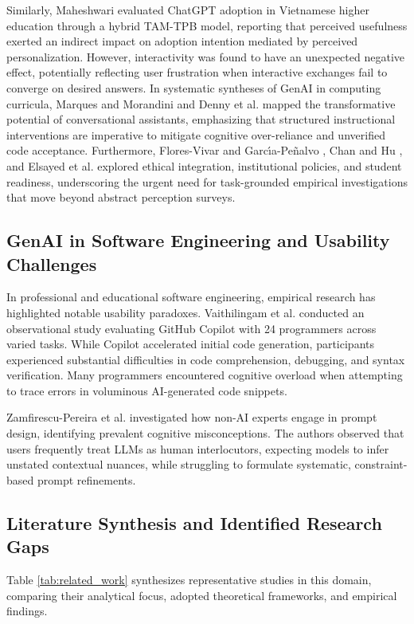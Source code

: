 \documentclass{cleiej}
\begin{document}
Similarly, Maheshwari \cite{maheshwari2024factors} evaluated ChatGPT adoption in Vietnamese higher education through a hybrid TAM-TPB model, reporting that perceived usefulness exerted an indirect impact on adoption intention mediated by perceived personalization. However, interactivity was found to have an unexpected negative effect, potentially reflecting user frustration when interactive exchanges fail to converge on desired answers. In systematic syntheses of GenAI in computing curricula, Marques and Morandini \cite{marques2024uso} and Denny et al. \cite{denny2024computing} mapped the transformative potential of conversational assistants, emphasizing that structured instructional interventions are imperative to mitigate cognitive over-reliance and unverified code acceptance. Furthermore, Flores-Vivar and Garc{\'\i}a-Pe{\~n}alvo \cite{flores2023reflections}, Chan and Hu \cite{chan2023potential}, and Elsayed et al. \cite{elsayed2023towards} explored ethical integration, institutional policies, and student readiness, underscoring the urgent need for task-grounded empirical investigations that move beyond abstract perception surveys.

\subsection{GenAI in Software Engineering and Usability Challenges}
In professional and educational software engineering, empirical research has highlighted notable usability paradoxes. Vaithilingam et al. \cite{vaithilingam2022expectation} conducted an observational study evaluating GitHub Copilot with 24 programmers across varied tasks. While Copilot accelerated initial code generation, participants experienced substantial difficulties in code comprehension, debugging, and syntax verification. Many programmers encountered cognitive overload when attempting to trace errors in voluminous AI-generated code snippets. 

Zamfirescu-Pereira et al. \cite{zamfirescu2023prompt} investigated how non-AI experts engage in prompt design, identifying prevalent cognitive misconceptions. The authors observed that users frequently treat LLMs as human interlocutors, expecting models to infer unstated contextual nuances, while struggling to formulate systematic, constraint-based prompt refinements.

\subsection{Literature Synthesis and Identified Research Gaps}
Table \ref{tab:related_work} synthesizes representative studies in this domain, comparing their analytical focus, adopted theoretical frameworks, and empirical findings.
\end{document}
